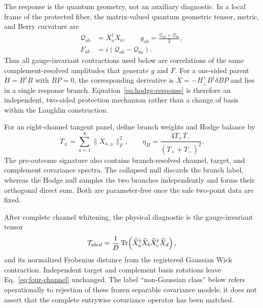 The response is the quantum geometry, not an auxiliary diagnostic. In a local frame of the protected fiber, the matrix-valued quantum geometric tensor, metric, and Berry curvature are
\begin{equation}
 \begin{aligned}
 \mathcal Q_{ab}&=X_a^\dagger X_b,\qquad
 g_{ab}=\frac{\mathcal Q_{ab}+\mathcal Q_{ba}}{2},\\
 F_{ab}&=i\left(\mathcal Q_{ab}-\mathcal Q_{ba}\right).
 \end{aligned}
 \label{eq:qgt-response}
\end{equation}
Thus all gauge-invariant contractions used below are correlations of the same complement-resolved amplitudes that generate \(g\) and \(F\). For a one-sided parent \(H=B^\dagger B\) with \(BP=0\), the corresponding derivative is \(X=-H_\perp^+B^\dagger\delta B P\) and lies in a single response branch. Equation~\eqref{eq:hodge-response} is therefore an independent, two-sided protection mechanism rather than a change of basis within the Laughlin construction.

For an eight-channel tangent panel, define branch weights and Hodge balance by
\begin{equation}
 T_\pm=\sum_{a=1}^{8}\lVert X_{a,\pm}\rVert_F^2,
 \qquad
 \eta_H=\frac{4T_+T_-}{(T_++T_-)^2}.
 \label{eq:hodge-balance}
\end{equation}
The pre-outcome signature also contains branch-resolved channel, target, and complement covariance spectra. The collapsed null discards the branch label, whereas the Hodge null samples the two branches independently and forms their orthogonal direct sum. Both are parameter-free once the safe two-point data are fixed.

After complete channel whitening, the physical diagnostic is the gauge-invariant tensor
\begin{equation}
 \mathcal T_{abcd}=\frac{1}{D}\operatorname{Tr}\!\left(
 \widehat X_a^\dagger\widehat X_b
 \widehat X_c^\dagger\widehat X_d\right),
 \label{eq:four-channel}
\end{equation}
and its normalized Frobenius distance from the registered Gaussian Wick contraction. Independent target and complement basis rotations leave Eq.~\eqref{eq:four-channel} unchanged. The label ``non-Gaussian class'' below refers operationally to rejection of these frozen separable covariance models; it does not assert that the complete entrywise covariance operator has been matched.
